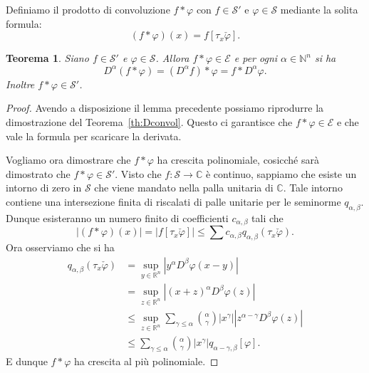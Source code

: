 \documentclass[italian,a4paper,oneside,headinclude]{scrbook}
\renewcommand{\phi}{\varphi}
\newcommand{\E}{\mathcal E}
\renewcommand{\S}{\mathcal S}
\newcommand{\CC}{\mathbb C}
\newcommand{\NN}{\mathbb N}
\newcommand{\RR}{\mathbb R}
\newcommand{\abs}[1]{{\left|#1\right|}}
\newtheorem{theorem}{Teorema}
\begin{document}
Definiamo il prodotto di convoluzione $f*\phi$ con $f\in \S'$ e
$\phi\in \S$ mediante la solita formula:
\[
  (f*\phi)(x) = f[\tau_x\check \phi].
\]

\begin{theorem}
  Siano $f\in \S'$ e $\phi\in \S$. Allora $f*\phi \in \E$ e per ogni
  $\alpha \in \NN^n$ si ha
  \[
  D^\alpha(f*\phi) = (D^\alpha f) * \phi = f * D^\alpha \phi.
  \]
  Inoltre $f*\phi\in \S'$.
\end{theorem}
%
\begin{proof}
  Avendo a disposizione il lemma precedente possiamo riprodurre la
  dimostrazione del Teorema~\ref{th:Dconvol}.
  Questo ci garantisce che $f*\phi \in \E$ e che vale la formula per
  scaricare la derivata.

  Vogliamo ora dimostrare che $f*\phi$ ha crescita polinomiale, cosicché
  sarà dimostrato che $f*\phi\in \S'$.
  Visto che $f\colon \S\to \CC$ è continuo, sappiamo che
  esiste un intorno di zero in $\S$
  che viene mandato nella palla unitaria di $\CC$. Tale intorno
  contiene una intersezione finita di riscalati di palle unitarie per
  le seminorme $q_{\alpha,\beta}$.
  Dunque esisteranno un
  numero finito di coefficienti $c_{\alpha,\beta}$ tali che
  \[
  \abs{(f*\phi)(x)} =
  \abs{f[\tau_x\check \phi]} \le \sum c_{\alpha,\beta}
  q_{\alpha,\beta}(\tau_x\check \phi).
  \]
  Ora osserviamo che si ha
  \begin{align*}
    q_{\alpha,\beta}(\tau_x\check \phi)
    &= \sup_{y\in \RR^n} \abs{y^\alpha D^\beta \phi(x-y)}\\
    &= \sup_{z\in \RR^n} \abs{(x+z)^\alpha D^\beta \phi(z)}\\
    &\le \sup_{z\in \RR^n} \sum_{\gamma\le \alpha}
    {\alpha\choose\gamma} \abs{x^\gamma} \abs{z^{\alpha-\gamma}
      D^\beta\phi(z)}\\
    & \le \sum_{\gamma\le\alpha} {\alpha\choose\gamma}\abs{x^\gamma}
    q_{\alpha-\gamma,\beta}[\phi].
  \end{align*}
  E dunque $f*\phi$ ha crescita al più polinomiale.
\end{proof}
\end{document}
